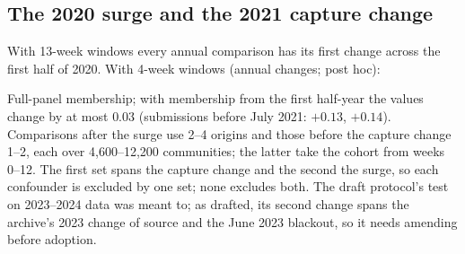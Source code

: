 \documentclass[10pt]{article}
\begin{document}
\subsection{The 2020 surge and the 2021 capture change}
With 13-week windows every annual comparison has its first change across the first half of 2020. With 4-week windows (annual changes; post hoc):
\begin{center}\small{}\end{center}
Full-panel membership; with membership from the first half-year the values change by at most $0.03$ (submissions before July 2021: $+0.13$, $+0.14$). Comparisons after the surge use 2--4 origins and those before the capture change 1--2, each over 4,600--12,200 communities; the latter take the cohort from weeks 0--12. The first set spans the capture change and the second the surge, so each confounder is excluded by one set; none excludes both. The draft protocol's test on 2023--2024 data was meant to; as drafted, its second change spans the archive's 2023 change of source and the June 2023 blackout, so it needs amending before adoption.
\end{document}
